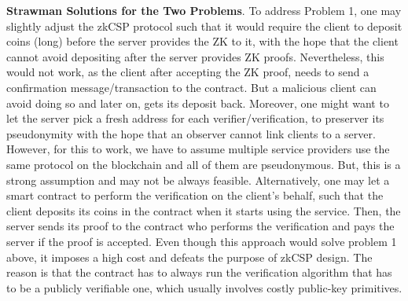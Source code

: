 \noindent\textbf{{Strawman Solutions for the Two Problems}}. To address  Problem 1, one may slightly adjust the zkCSP protocol such that it would require  the client to deposit coins (long) before the server provides the ZK to it, with the hope that the client cannot avoid depositing after the server  provides ZK proofs. Nevertheless, this would not work, as the client after accepting the ZK proof, needs to send a confirmation message/transaction to the contract. But a malicious client can avoid doing so and later on, gets its deposit back.  Moreover, one might want to let the server pick a fresh address for each verifier/verification, to  preserver its pseudonymity with the hope that an observer cannot link clients to a server. However, for this to work, we have to assume multiple service providers  use the same protocol on the blockchain and all of them are pseudonymous. But, this is a strong assumption and may  not be always feasible. Alternatively, one may let a smart contract to perform the verification on the client's behalf, such that the client deposits its coins in the contract when it starts using the service. Then, the server sends its proof to the contract who performs the verification and pays the server if the proof is accepted. Even though this approach would solve problem 1 above, it imposes a high cost and defeats the purpose of zkCSP design. The reason is that the contract has to always run the verification algorithm that  has to be a publicly verifiable one, which  usually involves costly public-key primitives. 














